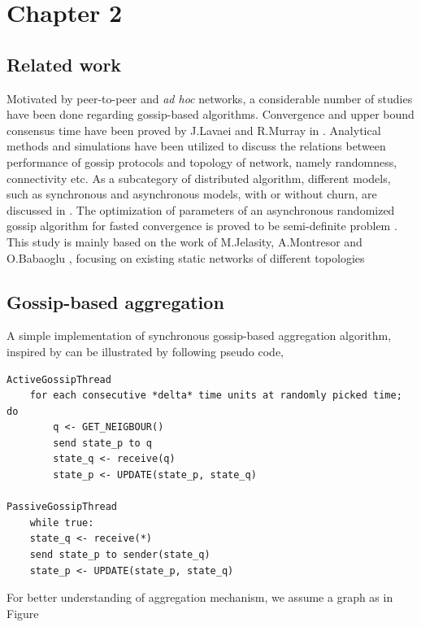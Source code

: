 \documentclass[11pt,a4paper]{article}
\begin{document}
\newpage

\section{Chapter 2}
\subsection{Related work}
Motivated by peer-to-peer and {\it ad hoc} networks, a considerable number of studies have been done regarding gossip-based algorithms. Convergence and upper bound consensus time have been proved by J.Lavaei and R.Murray in \cite{5929538}. Analytical methods and simulations have been utilized to discuss the relations between performance of gossip protocols and topology of network, namely randomness, connectivity etc. As a subcategory of distributed algorithm, different models, such as synchronous and asynchronous models, with or without churn, are discussed in \cite{Lynch:1996:DA:525656}. The optimization of parameters of an asynchronous randomized gossip algorithm for fasted convergence is proved to be semi-definite problem \cite{Boyd2004}.\\
This study is mainly based on the work of M.Jelasity, A.Montresor and O.Babaoglu \cite{jelasity_gossip-based_2005}, focusing on existing static networks of different topologies \cite{knight_internet_2011}

\subsection{Gossip-based aggregation}
A simple implementation of synchronous gossip-based aggregation algorithm, inspired by \cite{jelasity_gossip-based_2005} can be illustrated by following pseudo code,
\begin{verbatim}
ActiveGossipThread
    for each consecutive *delta* time units at randomly picked time; do
        q <- GET_NEIGBOUR()
        send state_p to q
        state_q <- receive(q)
        state_p <- UPDATE(state_p, state_q)

PassiveGossipThread
    while true:
    state_q <- receive(*)
    send state_p to sender(state_q)
    state_p <- UPDATE(state_p, state_q)
\end{verbatim}
For better understanding of aggregation mechanism, we assume a graph as in Figure
\end{document}
